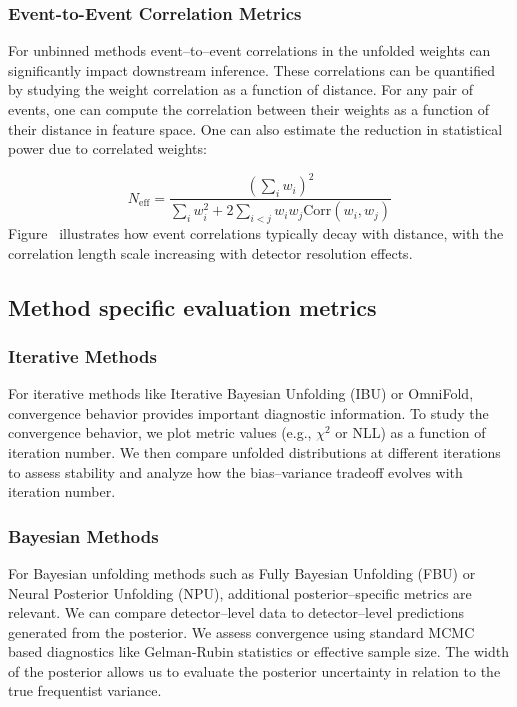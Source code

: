 \subsubsection{Event-to-Event Correlation Metrics}
For unbinned methods event--to--event correlations in the unfolded weights can significantly impact downstream inference.
%
These correlations can be quantified by studying the weight correlation as a function of distance.
%
For any pair of events, one can compute the correlation between their weights as a function of their distance in feature space.
%
One can also estimate the reduction in statistical power due to correlated weights:

\begin{equation}
N_{\text{eff}} = \frac{\left(\sum_{i} w_i\right)^2}{\sum_{i} w_i^2 + 2\sum_{i<j} w_i w_j \text{Corr}(w_i, w_j)}
\end{equation}
Figure~ illustrates how event correlations typically decay with distance, with the correlation length scale increasing with detector resolution effects.

\subsection{Method specific evaluation metrics}
\subsubsection{Iterative Methods}
For iterative methods like Iterative Bayesian Unfolding (IBU) or OmniFold, convergence behavior provides important diagnostic information.
%
To study the convergence behavior, we plot metric values (e.g., \(\chi^2\) or NLL) as a function of iteration number.
%
We then compare unfolded distributions at different iterations to assess stability and analyze how the bias--variance tradeoff evolves with iteration number.

\subsubsection{Bayesian Methods}
For Bayesian unfolding methods such as Fully Bayesian Unfolding (FBU) or Neural Posterior Unfolding (NPU), additional posterior--specific metrics are relevant.
%
We can compare detector--level data to detector--level predictions generated from the posterior.
%
We assess convergence using standard MCMC based diagnostics like Gelman-Rubin statistics or effective sample size.
%
The width of the posterior allows us to evaluate the posterior uncertainty in relation to the true frequentist variance.

